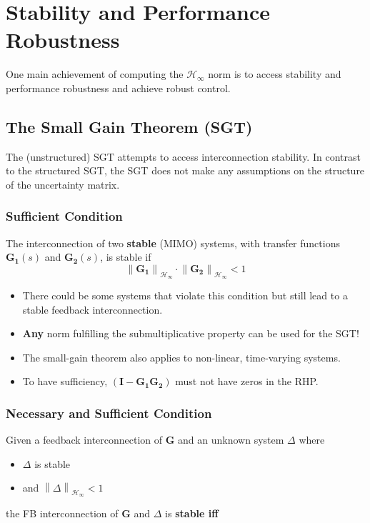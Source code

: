 \section{Stability and Performance Robustness}
One main achievement of computing the $\mathcal{H}_\infty$ norm is to access stability and performance robustness and achieve robust control.
\subsection{The Small Gain Theorem (SGT)}
The (unstructured) SGT attempts to access interconnection stability. In contrast to the structured SGT, the SGT does not make any assumptions on the structure of the uncertainty matrix.

\subsubsection{Sufficient Condition}

The interconnection of two \textbf{stable} (MIMO) systems, with transfer functions $\mathbf{G_1}(s)$ and $\mathbf{G_2}(s)$, is stable if
\begin{equation*}
    \left\|\mathbf{G_1}\right\|_{\mathcal{H}_\infty}\cdot\left\|\mathbf{G_2}\right\|_{\mathcal{H}_\infty}<1
\end{equation*}

\begin{itemize}
    \item There could be some systems that violate this condition but still lead to a stable feedback interconnection.
    \item \textbf{Any} norm fulfilling the submultiplicative property can be used for the SGT!
    \item The small-gain theorem also applies to non-linear, time-varying systems.
    \item To have sufficiency, $(\mathbf{I}-\mathbf{G_1G_2})$ must not have zeros in the RHP.
\end{itemize}

\subsubsection{Necessary and Sufficient Condition}
Given a feedback interconnection of $\mathbf{G}$ and an unknown system $\Delta$ where
\begin{itemize}
    \item $\Delta$ is stable
    \item and $\left\|\Delta\right\|_{\mathcal{H}_\infty}<1$
\end{itemize}
the FB interconnection of $\mathbf{G}$ and $\Delta$ is \textbf{stable iff}

